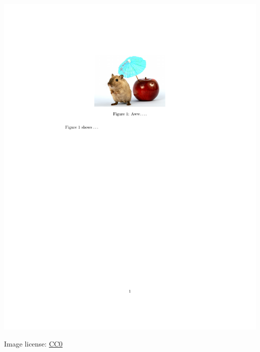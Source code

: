 \documentclass[aspectratio=169]{beamer}
\begin{document}
\begin{frame}{\insertsubsection}
\begin{minipage}{0.35\linewidth}
    \includegraphics[width=\textwidth,clip,trim=2in 5in 3in 1in]{figs/media-graphics.pdf}
\end{minipage}

\tiny{Image license: \href{https://pixabay.com/en/animal-apple-attractive-beautiful-1239390/}{CC0}}
\end{frame}

\end{document}
